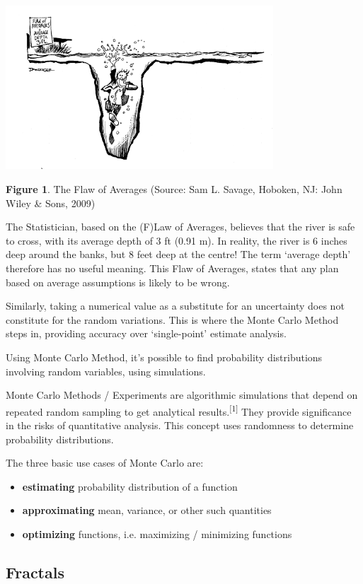\documentclass{resonance}
\begin{document}
\includegraphics[width=10cm]{the-flaw-of-averages}

\scriptsize{\textbf{Figure 1}. The Flaw of Averages (Source: Sam L. Savage, Hoboken, NJ: John Wiley \& Sons, 2009)}

\normalsize
The Statistician, based on the (F)Law of Averages, believes that the river is safe to cross, with its average depth of 3 ft (0.91 m). In reality, the river is 6 inches deep around the banks, but 8 feet deep at the centre! The term ‘average depth’ therefore has no useful meaning. This Flaw of Averages, states that any plan based on average assumptions is likely to be wrong.

Similarly, taking a numerical value as a substitute for an uncertainty does not constitute for the random variations. This is where the Monte Carlo Method steps in, providing accuracy over ‘single-point' estimate analysis.

Using Monte Carlo Method, it's possible to find probability distributions involving random variables, using simulations.

Monte Carlo Methods / Experiments are algorithmic simulations that depend on repeated random sampling to get analytical results.\textsuperscript{[1]} They provide significance in the risks of quantitative analysis. This concept uses randomness to determine probability distributions.

The three basic use cases of Monte Carlo are:
\begin{itemize}
	\item \textbf{estimating} probability distribution of a function
	\item \textbf{approximating} mean, variance, or other such quantities
	\item \textbf{optimizing} functions, i.e. maximizing / minimizing functions
\end{itemize}

\subsection*{Fractals}
\end{document}
